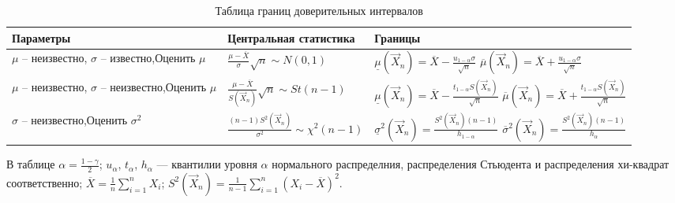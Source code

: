 \begin{small}
\begin{center}
    \captionsetup{justification=raggedright,singlelinecheck=off}
    \begin{longtable}[c]{|p{4cm}|p{6cm}|p{5cm}|}
    \caption{Таблица границ доверительных интервалов} \\ \hline
		\textbf{Параметры} & \textbf{Центральная статистика} & \textbf{Границы} \\ \hline
		$\mu$ -- неизвестно, \newline $\sigma$ -- известно,\newline Оценить $\mu$ & \newline $\frac{\mu - \overline{X}}{\sigma} \sqrt{n} \sim N(0,1)$ &  $\underline\mu(\vec X_n) = \overline{X} - \frac{u_{1 - \alpha} \sigma}{\sqrt{n}}$ \newline\newline $\overline\mu(\vec X_n) = \overline{X} + \frac{u_{1 - \alpha} \sigma}{\sqrt{n}}$ \\ \hline
		
        $\mu$ -- неизвестно, \newline $\sigma$ -- неизвестно,\newline Оценить $\mu$ & \newline $\frac{\mu - \overline{X}}{S(\vec X_n)} \sqrt{n} \sim St(n - 1)$ &  $\underline\mu(\vec X_n) = \overline{X} - \frac{t_{1 - \alpha} S(\vec X_n)}{\sqrt{n}}$ \newline\newline $\overline\mu(\vec X_n) = \overline{X} + \frac{t_{1 - \alpha} S(\vec X_n)}{\sqrt{n}}$ \\ \hline

        $\sigma$ -- неизвестно,\newline Оценить $\sigma^2$ & \newline $\frac{(n - 1) S^2(\vec X_n)}{\sigma^2} \sim \chi^2(n - 1)$ &  $\underline\sigma^2(\vec X_n) = \frac{S^2(\vec X_n) (n - 1)}{h_{1 - \alpha}}$ \newline\newline $\overline\sigma^2(\vec X_n) = \frac{S^2(\vec X_n) (n - 1)}{h_{\alpha}}$ \\ \hline
	\end{longtable}
\end{center}
\end{small}

В таблице $\alpha = \frac{1 - \gamma}{2}$; $u_{\alpha}$, $t_{\alpha}$, $h_{\alpha}$ --- квантилии уровня $\alpha$ нормального распределния, распределения Стьюдента и распределения хи-квадрат соответственно; \newline $\overline{X} = \frac {1}{n} \sum_{i=1}^n X_i$; $S^2(\vec X_n) = \frac 1{n-1} \sum_{i=1}^n (X_i-\overline X)^2$.


